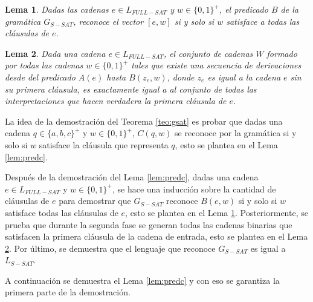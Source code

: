 \documentclass{article}
\newtheorem{lemma}{Lema}
\begin{document}
\begin{lemma}
    \label{lem:predb}
    Dadas las cadenas $e\in L_{FULL-SAT}$ y $w\in \{0,1\}^+$, el predicado $B$ de la gramática $G_{S-SAT}$, reconoce el vector $[e,w]$  si y solo si $w$ satisface a todas las cláusulas de $e$.
\end{lemma}

\begin{lemma}
    \label{lem:preda}
    Dada una cadena $e\in L_{FULL-SAT}$, el conjunto de cadenas $W$ formado por todas las cadenas
    $w\in \{0,1\}^+$ tales que existe una secuencia de derivaciones desde del predicado $A(e)$ hasta
    $B(z_e,w)$, donde $z_e$ es igual a la cadena $e$ sin su primera cláusula, es exactamente igual a
    al conjunto de todas las interpretaciones que hacen verdadera la primera cláusula de $e$.
\end{lemma}

La idea de la demostración del Teorema \ref{teo:gsat} es probar que dadas una cadena $q\in \{a,b,c\}^+$ y
$w\in \{0,1\}^+$, $C(q,w)$ se reconoce por la gramática si y solo si $w$ satisface la cláusula que
representa $q$, esto se plantea en el Lema \ref{lem:predc}.

Después de la demostración del Lema \ref{lem:predc}, dadas una cadena $e\in L_{FULL-SAT}$ y $w\in \{0,1\}^+$, se hace una inducción sobre la cantidad de cláusulas de $e$ para demostrar que $G_{S-SAT}$ reconoce $B(e,w)$ si y solo si $w$ satisface todas las cláusulas de $e$, esto se plantea en el Lema \ref{lem:predb}. Posteriormente, se prueba que durante la segunda fase se generan todas las cadenas binarias que satisfacen la primera cláusula de la cadena de entrada, esto se plantea en el Lema \ref{lem:preda}. Por último, se demuestra que el lenguaje que reconoce $G_{S-SAT}$ es igual a $L_{S-SAT}$.

A continuación se demuestra el Lema \ref{lem:predc} y con eso se garantiza la primera parte de la demostración.
\end{document}
